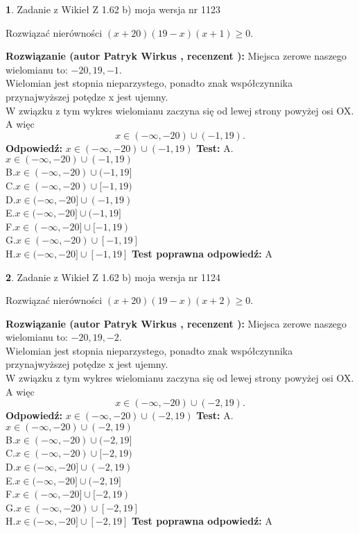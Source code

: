 \documentclass[12pt, a4paper]{article}
\theoremstyle{definition} %
\newtheorem{zad}{}
\newcommand{\zadStart}[1]{\begin{zad}#1\newline}
\newcommand{\zadStop}{\end{zad}}
\newcommand{\rozwStart}[2]{\noindent \textbf{Rozwiązanie (autor #1 , recenzent #2): }\newline}
\newcommand{\rozwStop}{\newline}
\newcommand{\odpStart}{\noindent \textbf{Odpowiedź:}\newline}
\newcommand{\odpStop}{\newline}
\newcommand{\testStart}{\noindent \textbf{Test:}\newline}
\newcommand{\testStop}{\newline}
\newcommand{\kluczStart}{\noindent \textbf{Test poprawna odpowiedź:}\newline}
\newcommand{\kluczStop}{\newline}
\begin{document}
\zadStart{Zadanie z Wikieł Z 1.62 b) moja wersja nr 1123}

Rozwiązać nierówności $(x+20)(19-x)(x+1)\ge0$.
\zadStop
\rozwStart{Patryk Wirkus}{}
Miejsca zerowe naszego wielomianu to: $-20, 19, -1$.\\
Wielomian jest stopnia nieparzystego, ponadto znak współczynnika przy\linebreak najwyższej potędze x jest ujemny.\\ W związku z tym wykres wielomianu zaczyna się od lewej strony powyżej osi OX. A więc $$x \in (-\infty,-20) \cup (-1,19).$$
\rozwStop
\odpStart
$x \in (-\infty,-20) \cup (-1,19)$
\odpStop
\testStart
A.$x \in (-\infty,-20) \cup (-1,19)$\\
B.$x \in (-\infty,-20) \cup (-1,19]$\\
C.$x \in (-\infty,-20) \cup [-1,19)$\\
D.$x \in (-\infty,-20] \cup (-1,19)$\\
E.$x \in (-\infty,-20] \cup (-1,19]$\\
F.$x \in (-\infty,-20] \cup [-1,19)$\\
G.$x \in (-\infty,-20) \cup [-1,19]$\\
H.$x \in (-\infty,-20] \cup [-1,19]$
\testStop
\kluczStart
A
\kluczStop



\zadStart{Zadanie z Wikieł Z 1.62 b) moja wersja nr 1124}

Rozwiązać nierówności $(x+20)(19-x)(x+2)\ge0$.
\zadStop
\rozwStart{Patryk Wirkus}{}
Miejsca zerowe naszego wielomianu to: $-20, 19, -2$.\\
Wielomian jest stopnia nieparzystego, ponadto znak współczynnika przy\linebreak najwyższej potędze x jest ujemny.\\ W związku z tym wykres wielomianu zaczyna się od lewej strony powyżej osi OX. A więc $$x \in (-\infty,-20) \cup (-2,19).$$
\rozwStop
\odpStart
$x \in (-\infty,-20) \cup (-2,19)$
\odpStop
\testStart
A.$x \in (-\infty,-20) \cup (-2,19)$\\
B.$x \in (-\infty,-20) \cup (-2,19]$\\
C.$x \in (-\infty,-20) \cup [-2,19)$\\
D.$x \in (-\infty,-20] \cup (-2,19)$\\
E.$x \in (-\infty,-20] \cup (-2,19]$\\
F.$x \in (-\infty,-20] \cup [-2,19)$\\
G.$x \in (-\infty,-20) \cup [-2,19]$\\
H.$x \in (-\infty,-20] \cup [-2,19]$
\testStop
\kluczStart
A
\kluczStop
\end{document}

